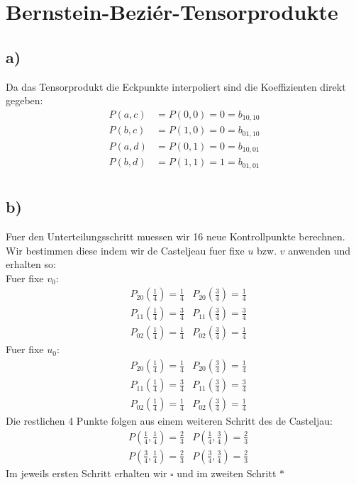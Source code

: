 
\section*{Bernstein-Bezi\'er-Tensorprodukte}
\subsection*{a)} 


Da das Tensorprodukt die Eckpunkte interpoliert sind die Koeffizienten direkt gegeben:
\begin{align}
	P(a,c) &= P(0,0) = 0 = b_{10,10} \\
	P(b,c) &= P(1,0) = 0 = b_{01,10} \\
	P(a,d) &= P(0,1) = 0 = b_{10,01} \\
	P(b,d) &= P(1,1) = 1 = b_{01,01} \\
\end{align}


\subsection*{b)}
Fuer den Unterteilungsschritt muessen wir 16 neue Kontrollpunkte berechnen. Wir bestimmen diese indem wir de Casteljeau fuer fixe $u$ bzw. $v$ anwenden und erhalten so:\\
Fuer fixe $v_0$:
\begin{align}
	&P_{20}(\frac{1}{4}) = \frac{1}{4} 
	&P_{20}(\frac{3}{4}) = \frac{1}{4} \\
	&P_{11}(\frac{1}{4}) = \frac{3}{4} 
	&P_{11}(\frac{3}{4}) = \frac{3}{4} \\
	&P_{02}(\frac{1}{4}) = \frac{1}{4} 	
	&P_{02}(\frac{3}{4}) = \frac{1}{4} 
\end{align}
Fuer fixe $u_0$:
\begin{align}
	&P_{20}(\frac{1}{4}) = \frac{1}{4} 
	&P_{20}(\frac{3}{4}) = \frac{1}{4} \\
	&P_{11}(\frac{1}{4}) = \frac{3}{4} 
	&P_{11}(\frac{3}{4}) = \frac{3}{4} \\
	&P_{02}(\frac{1}{4}) = \frac{1}{4} 	
	&P_{02}(\frac{3}{4}) = \frac{1}{4} 
\end{align}
Die restlichen 4 Punkte folgen aus einem weiteren Schritt des de Casteljau:
\begin{align}
	&P(\frac{1}{4},\frac{1}{4}) = \frac{2}{3} 
	&P(\frac{1}{4},\frac{3}{4}) = \frac{2}{3} \\
	&P(\frac{3}{4},\frac{1}{4}) = \frac{2}{3} 
	&P(\frac{3}{4},\frac{3}{4}) = \frac{2}{3} 
\end{align}
Im jeweils ersten Schritt erhalten wir $\square$ und im zweiten Schritt $*$ \\
\\


